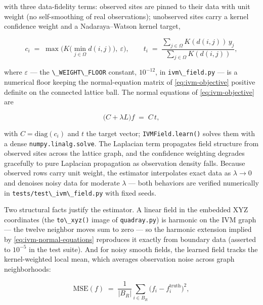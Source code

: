 \documentclass[
  10pt,
]{article}
\newcommand{\passthrough}[1]{#1}
\begin{document}
with three data-fidelity terms: observed sites are pinned to their data
with unit weight (no self-smoothing of real observations); unobserved
sites carry a kernel confidence weight and a Nadaraya--Watson kernel
target,

\begin{equation}
\label{eq:ivm-confidence}
c_i \;=\; \max\bigl( K\bigl(\min_{j \in \Omega} d(i,j)\bigr),\ \varepsilon \bigr),
\qquad
t_i \;=\; \frac{\sum_{j \in \Omega} K(d(i,j))\, y_j}{\sum_{j \in \Omega} K(d(i,j))},
\end{equation}

where \(\varepsilon\) --- the \passthrough{\lstinline!\_WEIGHT\_FLOOR!}
constant, \(10^{-12}\), in \passthrough{\lstinline!ivm\_field.py!} ---
is a numerical floor keeping the normal-equation matrix of
\eqref{eq:ivm-objective} positive definite on the connected lattice
ball. The normal equations of \eqref{eq:ivm-objective} are

\begin{equation}
\label{eq:ivm-normal-equations}
\bigl( C + \lambda L \bigr) f \;=\; C\, t ,
\end{equation}

with \(C = \mathrm{diag}(c_i)\) and \(t\) the target vector;
\passthrough{\lstinline!IVMField.learn()!} solves them with a dense
\passthrough{\lstinline!numpy.linalg.solve!}. The Laplacian term
propagates field structure from observed sites across the lattice graph,
and the confidence weighting degrades gracefully to pure Laplacian
propagation as observation density falls. Because observed rows carry
unit weight, the estimator interpolates exact data as \(\lambda \to 0\)
and denoises noisy data for moderate \(\lambda\) --- both behaviors are
verified numerically in
\passthrough{\lstinline!tests/test\_ivm\_field.py!} with fixed seeds.

Two structural facts justify the estimator. A linear field in the
embedded XYZ coordinates (the \passthrough{\lstinline!to\_xyz()!} image
of \passthrough{\lstinline!quadray.py!}) is harmonic on the IVM graph
--- the twelve neighbor moves sum to zero --- so the harmonic extension
implied by \eqref{eq:ivm-normal-equations} reproduces it exactly from
boundary data (asserted to \(10^{-5}\) in the test suite). And for noisy
smooth fields, the learned field tracks the kernel-weighted local mean,
which averages observation noise across graph neighborhoods:

\begin{equation}
\label{eq:ivm-mse}
\mathrm{MSE}(f) \;=\; \frac{1}{|B_R|} \sum_{i \in B_R} \bigl( f_i - f_i^{\text{truth}} \bigr)^2 ,
\end{equation}
\end{document}
